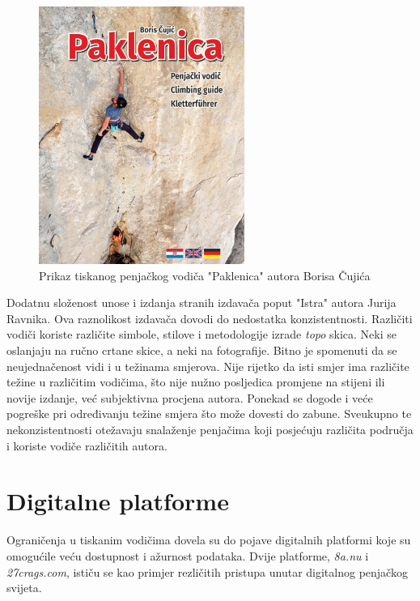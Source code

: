 \begin{figure}[H]
    \centering
    \includegraphics[width=0.6\textwidth]{images/analiza/vodic_paklenica.jpeg}
    \caption{Prikaz tiskanog penjačkog vodiča "Paklenica" autora Borisa Čujića}
    \label{fig:vodic_paklenica}
\end{figure}

Dodatnu složenost unose i izdanja stranih izdavača poput "Istra" autora Jurija Ravnika. Ova raznolikost izdavača dovodi do nedostatka konzistentnosti. Različiti vodiči koriste različite simbole, stilove i metodologije izrade \textit{topo} skica. Neki se oslanjaju na ručno crtane skice, a neki na fotografije. Bitno je spomenuti da se neujednačenost vidi i u težinama smjerova. Nije rijetko da isti smjer ima različite težine u različitim vodičima, što nije nužno posljedica promjene na stijeni ili novije izdanje, već subjektivna procjena autora. Ponekad se dogode i veće pogreške pri određivanju težine smjera što može dovesti do zabune. Sveukupno te nekonzistentnosti otežavaju snalaženje penjačima koji posjećuju različita područja i koriste vodiče različitih autora. 




\section{Digitalne platforme}

Ograničenja u tiskanim vodičima dovela su do pojave digitalnih platformi koje su omogućile veću dostupnost i ažurnost podataka. Dvije platforme, \textit{8a.nu} i \textit{27crags.com}, ističu se kao primjer rezličitih pristupa unutar digitalnog penjačkog svijeta. 

